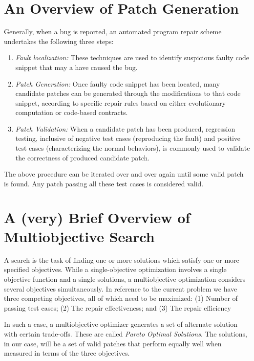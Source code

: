 \documentclass[]{sig-alternate}
\theoremstyle{break}
\begin{document}
\section{An Overview of Patch Generation}

Generally, when a bug is reported, an automated program repair scheme undertakes the following three steps:

\begin{enumerate}
    \item \textit{Fault localization:}
    These techniques are used to identify suspicious faulty code snippet that may a have caused the bug.

    \item \textit{Patch Generation:}
    Once faulty code snippet has been located, many candidate patches can be generated through the modifications to that code snippet, according to specific repair rules based on either evolutionary computation or code-based contracts.

    \item \textit{Patch Validation:}
    When a candidate patch has been produced, regression testing, inclusive of negative test cases (reproducing the fault) and positive test cases (characterizing the normal behaviors), is commonly used to validate the correctness of produced candidate patch.

\end{enumerate}

The above procedure can be iterated over and over again until some valid patch is found. Any patch passing all these test cases is considered valid.


\section{A (very) Brief Overview of Multiobjective Search}

A search is the task of finding one or more solutions which satisfy one or more specified objectives. While a single-objective optimization involves a single objective function and a single solutions, a multiobjective optimization considers several objectives simultaneously. In reference to the current problem we have three competing objectives, all of which need to be maximized: (1) Number of passing test cases; (2) The repair effectiveness; and (3) The repair efficiency

In such a case, a multiobjective optimizer generates a set of alternate solution with certain trade-offs. These are called \textit{Pareto Optimal Solutions}. The solutions, in our case, will be a set of valid patches that perform equally well when measured in terms of the three objectives.
\end{document}
